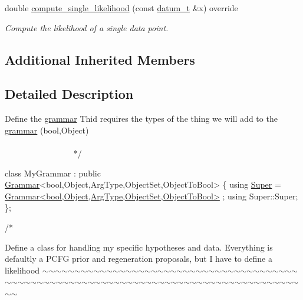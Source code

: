 \begin{DoxyCompactItemize}
double \hyperlink{class_my_hypothesis_af23a45a03a28ea4f42438e70d47acacb}{compute\+\_\+single\+\_\+likelihood} (const \hyperlink{class_bayesable_a9f1a6c0cd7855550fa10b1a8f13a5867}{datum\+\_\+t} \&x) override
\begin{DoxyCompactList}\small\item\em Compute the likelihood of a single data point. \end{DoxyCompactList}\end{DoxyCompactItemize}
\subsection*{Additional Inherited Members}


\subsection{Detailed Description}

\begin{DoxyCode}
    Define the \hyperlink{class_l_o_t_hypothesis_affae32db28c39df676809ae47e14e7cf}{grammar}
    Thid requires the types of the thing we will add to the \hyperlink{class_l_o_t_hypothesis_affae32db28c39df676809ae47e14e7cf}{grammar} (\textcolor{keywordtype}{bool},Object)
   ~~~~~~~~~~~~~~~~~~~~~~~~~~~~~~~~~~~~~~~~~~~~~~~~~~~~~~~~~~~~~~~~~~~~~~~~~~~~~~~~~~~~~~~~ */



\textcolor{keyword}{class }MyGrammar : \textcolor{keyword}{public} \hyperlink{class_grammar}{Grammar}<bool,Object,ArgType,ObjectSet,ObjectToBool> \{
    \textcolor{keyword}{using} \hyperlink{class_my_hypothesis_a12e3d952f8fca502912d3bd868fa9f99}{Super} =  \hyperlink{class_grammar}{Grammar<bool,Object,ArgType,ObjectSet,ObjectToBool>}
      ;
    \textcolor{keyword}{using} Super::Super;
\};


\textcolor{comment}{/*}
\end{DoxyCode}
 Define a class for handling my specific hypotheses and data. Everything is defaultly a P\+C\+FG prior and regeneration proposals, but I have to define a likelihood $\sim$$\sim$$\sim$$\sim$$\sim$$\sim$$\sim$$\sim$$\sim$$\sim$$\sim$$\sim$$\sim$$\sim$$\sim$$\sim$$\sim$$\sim$$\sim$$\sim$$\sim$$\sim$$\sim$$\sim$$\sim$$\sim$$\sim$$\sim$$\sim$$\sim$$\sim$$\sim$$\sim$$\sim$$\sim$$\sim$$\sim$$\sim$$\sim$$\sim$$\sim$$\sim$$\sim$$\sim$$\sim$$\sim$$\sim$$\sim$$\sim$$\sim$$\sim$$\sim$$\sim$$\sim$$\sim$$\sim$$\sim$$\sim$$\sim$$\sim$$\sim$$\sim$$\sim$$\sim$$\sim$$\sim$$\sim$$\sim$$\sim$$\sim$$\sim$$\sim$$\sim$$\sim$$\sim$$\sim$$\sim$$\sim$$\sim$$\sim$$\sim$$\sim$$\sim$$\sim$$\sim$$\sim$$\sim$$\sim$


